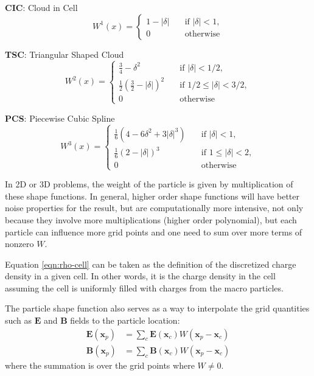 \textbf{CIC}: Cloud in Cell
\begin{equation}
    W^1(x) = \begin{cases}
        1 - |\delta| & \quad \text{if } |\delta| < 1, \\
        0            & \quad \text{otherwise}
    \end{cases}
\end{equation}

\textbf{TSC}: Triangular Shaped Cloud
\begin{equation}
    W^2(x) =
    \begin{cases}
        \frac{3}{4} - \delta^2 & \quad \text{if } |\delta| < 1/2, \\
        \frac{1}{2} \left( \frac{3}{2} - |\delta| \right)^2 & \quad \text{if } 1/2 \leq |\delta| < 3/2, \\
        0                      & \quad \text{otherwise}
    \end{cases}
\end{equation}

\textbf{PCS}: Piecewise Cubic Spline
\begin{equation}
    W^3(x) =
    \begin{cases}
        \frac{1}{6} \left( 4 - 6\delta^2 + 3|\delta|^3 \right) & \quad \text{if } |\delta| < 1, \\
        \frac{1}{6} \left( 2 - |\delta| \right)^3 & \quad \text{if } 1 \leq |\delta| < 2, \\
        0                      & \quad \text{otherwise}
    \end{cases}
\end{equation}

In 2D or 3D problems, the weight of the particle is given by multiplication of
these shape functions. In general, higher order shape functions will have better
noise properties for the result, but are computationally more intensive, not
only because they involve more multiplications (higher order polynomial), but
each particle can influence more grid points and one need to sum over more terms
of nonzero $W$.

Equation \eqref{eqn:rho-cell} can be taken as the definition of the discretized
charge density in a given cell. In other words, it is the charge density in the
cell assuming the cell is uniformly filled with charges from the macro particles.

The particle shape function also serves as a way to interpolate the grid
quantities such as $\mathbf{E}$ and $\mathbf{B}$ fields to the particle
location:
\begin{align}
    \label{eqn:interpolate}
    \mathbf{E}(\mathbf{x}_p) &= \sum_c \mathbf{E}(\mathbf{x}_c) W(\mathbf{x}_p - \mathbf{x}_c) \\
    \mathbf{B}(\mathbf{x}_p) &= \sum_c \mathbf{B}(\mathbf{x}_c) W(\mathbf{x}_p - \mathbf{x}_c)
\end{align}
where the summation is over the grid points where $W \neq 0$.

